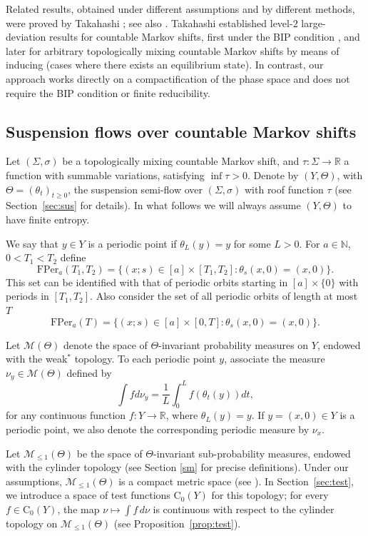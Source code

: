 \documentclass[letterpaper,11pt]{amsart}
\numberwithin{equation}{section}     %
\newcommand{\M}{\mathcal{M}}
\newcommand{\R}{\mathbb{R}}
\newcommand{\N}{\mathbb{N}}
\def\R{{\mathbb R}}
\def\N{{\mathbb N}}
\def\M{{\mathcal M}}
\def\le{\leqslant}
\def\ge{\geqslant}
\def\M{\mathcal{M}}
\begin{document}
Related results, obtained under different assumptions and by different methods, were proved by Takahashi \cite{ta1,ta2}; see also \cite{fl}. Takahashi established level-$2$ large-deviation results for countable Markov shifts, first under the BIP condition \cite{ta1}, and later for arbitrary topologically mixing countable Markov shifts by means of inducing \cite{ta2} (cases where there exists an equilibrium state). In contrast, our approach works directly on a compactification of the phase space and does not require the BIP condition or finite reducibility.
















\subsection{Suspension flows over countable Markov shifts} Let $(\Sigma,\sigma)$ be a topologically mixing countable Markov shift, and  $\tau:\Sigma\to\R$ a function with summable variations, satisfying $\inf\tau>0$. Denote by $(Y,\Theta)$, with $\Theta=(\theta_t)_{t\ge 0}$, the suspension semi-flow over $(\Sigma,\sigma)$ with roof function $\tau$ (see Section~\ref{sec:sus} for details). In what follows we will always assume $(Y,\Theta)$ to have finite  entropy.


We say that $y \in Y$ is a periodic point if $\theta_L(y) = y$ for some $L>0$. For $a\in\N$, $0<T_1<T_2$ define
$$\text{FPer}_a(T_1,T_2)=\{(x;s)\in[a]\times [T_1,T_2]:\theta_s(x,0)=(x,0)\}.$$
This set can be identified with that  of periodic orbits starting in $[a]\times \{0\}$ with periods in $[T_1,T_2]$. Also consider the set of all periodic orbits of length at most $T$
$$\text{FPer}_a(T)=\{(x;s)\in[a]\times [0,T]:\theta_s(x,0)=(x,0)\}.$$

Let $\M(\Theta)$ denote the space of $\Theta$-invariant probability measures on $Y$, endowed with the weak$^\ast$ topology. To each periodic point $y$, associate the measure $\nu_y\in\M(\Theta)$ defined  by
$$\int f  d\nu_y = \frac{1}{L} \int_0^L f(\theta_t(y))  dt,$$
for any continuous function $f:Y\to\R$, where $\theta_L(y)=y$. If $y = (x,0)\in Y$ is a periodic point, we also denote the corresponding periodic measure by $\nu_x$. 
 
Let $\M_{\le 1}(\Theta)$ be the space of $\Theta$-invariant sub-probability measures, endowed with the cylinder topology  (see Section \ref{sm} for precise definitions). Under our assumptions, $\M_{\le 1}(\Theta)$ is a compact metric space (see \cite[Theorem 1.6]{v}). In Section~\ref{sec:test}, we introduce a space of test functions $\text{C}_0(Y)$ for this topology; for every $f\in\text{C}_0(Y)$, the map $\nu \mapsto \int f \, d\nu$ is continuous with respect to the cylinder topology on $\M_{\le 1}(\Theta)$ (see Proposition~\ref{prop:test}).
\end{document}
